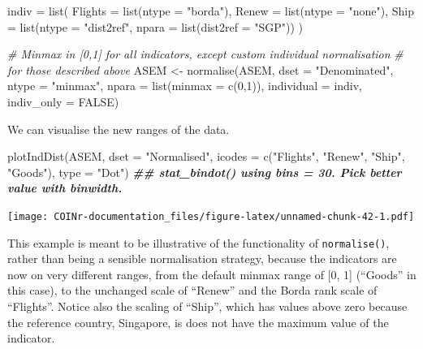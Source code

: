 \documentclass[
]{book}
\newenvironment{Shaded}{\begin{snugshade}}{\end{snugshade}}
\newcommand{\AttributeTok}[1]{\textcolor[rgb]{0.77,0.63,0.00}{#1}}
\newcommand{\CommentTok}[1]{\textcolor[rgb]{0.56,0.35,0.01}{\textit{#1}}}
\newcommand{\ConstantTok}[1]{\textcolor[rgb]{0.00,0.00,0.00}{#1}}
\newcommand{\DecValTok}[1]{\textcolor[rgb]{0.00,0.00,0.81}{#1}}
\newcommand{\DocumentationTok}[1]{\textcolor[rgb]{0.56,0.35,0.01}{\textbf{\textit{#1}}}}
\newcommand{\FunctionTok}[1]{\textcolor[rgb]{0.00,0.00,0.00}{#1}}
\newcommand{\NormalTok}[1]{#1}
\newcommand{\OtherTok}[1]{\textcolor[rgb]{0.56,0.35,0.01}{#1}}
\newcommand{\StringTok}[1]{\textcolor[rgb]{0.31,0.60,0.02}{#1}}
\begin{document}
\begin{Shaded}
\begin{Highlighting}[]
\NormalTok{indiv }\OtherTok{=} \FunctionTok{list}\NormalTok{(}
  \AttributeTok{Flights =} \FunctionTok{list}\NormalTok{(}\AttributeTok{ntype =} \StringTok{"borda"}\NormalTok{),}
  \AttributeTok{Renew =} \FunctionTok{list}\NormalTok{(}\AttributeTok{ntype =} \StringTok{"none"}\NormalTok{),}
  \AttributeTok{Ship =} \FunctionTok{list}\NormalTok{(}\AttributeTok{ntype =} \StringTok{"dist2ref"}\NormalTok{, }\AttributeTok{npara =} \FunctionTok{list}\NormalTok{(}\AttributeTok{dist2ref =} \StringTok{"SGP"}\NormalTok{))}
\NormalTok{)}

\CommentTok{\# Minmax in [0,1] for all indicators, except custom individual normalisation}
\CommentTok{\# for those described above}
\NormalTok{ASEM }\OtherTok{\textless{}{-}} \FunctionTok{normalise}\NormalTok{(ASEM, }\AttributeTok{dset =} \StringTok{"Denominated"}\NormalTok{, }\AttributeTok{ntype =} \StringTok{"minmax"}\NormalTok{, }\AttributeTok{npara =} \FunctionTok{list}\NormalTok{(}\AttributeTok{minmax =} \FunctionTok{c}\NormalTok{(}\DecValTok{0}\NormalTok{,}\DecValTok{1}\NormalTok{)),}
                  \AttributeTok{individual =}\NormalTok{ indiv, }\AttributeTok{indiv\_only =} \ConstantTok{FALSE}\NormalTok{)}
\end{Highlighting}
\end{Shaded}

We can visualise the new ranges of the data.

\begin{Shaded}
\begin{Highlighting}[]
\FunctionTok{plotIndDist}\NormalTok{(ASEM, }\AttributeTok{dset =} \StringTok{"Normalised"}\NormalTok{,}
            \AttributeTok{icodes =} \FunctionTok{c}\NormalTok{(}\StringTok{"Flights"}\NormalTok{, }\StringTok{"Renew"}\NormalTok{, }\StringTok{"Ship"}\NormalTok{, }\StringTok{"Goods"}\NormalTok{), }\AttributeTok{type =} \StringTok{"Dot"}\NormalTok{)}
\DocumentationTok{\#\# \textasciigrave{}stat\_bindot()\textasciigrave{} using \textasciigrave{}bins = 30\textasciigrave{}. Pick better value with \textasciigrave{}binwidth\textasciigrave{}.}
\end{Highlighting}
\end{Shaded}

\texttt{[image: COINr-documentation\_files/figure-latex/unnamed-chunk-42-1.pdf]}

This example is meant to be illustrative of the functionality of \texttt{normalise()}, rather than being a sensible normalisation strategy, because the indicators are now on very different ranges, from the default minmax range of {[}0, 1{]} (``Goods'' in this case), to the unchanged scale of ``Renew'' and the Borda rank scale of ``Flights''. Notice also the scaling of ``Ship'', which has values above zero because the reference country, Singapore, is does not have the maximum value of the indicator.
\end{document}
